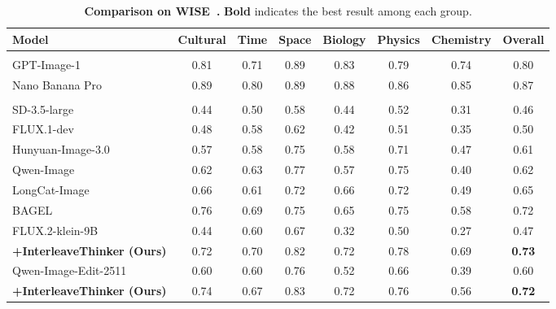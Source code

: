 \documentclass{article} %
\begin{document}
\begin{table}[t]
\small 
  \caption{\textbf{Comparison on WISE~\cite{niu2025wise}.} \textbf{Bold} indicates the best result among each group.}
  \label{tab:wise_benchmark_comparison}
  \centering
{
\setlength{\tabcolsep}{3pt}  
  \begin{tabular}{l ccccccc}
    \toprule[0.1em]
    \textbf{Model} & \textbf{Cultural} & \textbf{Time} & \textbf{Space} & \textbf{Biology} & \textbf{Physics} & \textbf{Chemistry} & \textbf{Overall} \\
    \midrule[0.1em]
    \rowcolor{gray!10}
    \multicolumn{8}{c}{\textbf{\textit{Proprietary Frontier Models}}} \\
    \midrule[0.1em]
    GPT-Image-1~\cite{gptimage}         & 0.81 & 0.71 & 0.89 & 0.83 & 0.79 & 0.74 & 0.80 \\
    Nano Banana Pro~\cite{nanopro}     & 0.89 & 0.80 & 0.89 & 0.88 & 0.86 & 0.85 & 0.87 \\
    \midrule[0.1em]
    \rowcolor{gray!10}
    \multicolumn{8}{c}{\textbf{\textit{Open-Sourced Models}}} \\
    \midrule[0.1em]
    SD-3.5-large~\cite{sd35l}        & 0.44 & 0.50 & 0.58 & 0.44 & 0.52 & 0.31 & 0.46 \\
    FLUX.1-dev~\cite{flux2024}          & 0.48 & 0.58 & 0.62 & 0.42 & 0.51 & 0.35 & 0.50 \\
    Hunyuan-Image-3.0~\cite{cao2025hunyuanimage} & 0.57 & 0.58 & 0.75 & 0.58 & 0.71 & 0.47 & 0.61 \\
    Qwen-Image~\cite{qwenimage}   & 0.62 & 0.63 & 0.77 & 0.57 & 0.75 & 0.40 & 0.62 \\
    LongCat-Image~\cite{longcatimage}  & 0.66 & 0.61 & 0.72 & 0.66 & 0.72 & 0.49 & 0.65 \\
    BAGEL~\cite{bagel}  & 0.76 & 0.69 & 0.75 & 0.65 & 0.75 & 0.58 & 0.72 \\
    \midrule[0.1em]
    FLUX.2-klein-9B~\cite{flux2}  & 0.44 & 0.60 & 0.67 & 0.32 & 0.50 & 0.27 & 0.47 \\
    \quad\textbf{+InterleaveThinker (Ours)} & 0.72 & 0.70 & 0.82 & 0.72 & 0.78 & 0.69 & \textbf{0.73}  \\
    Qwen-Image-Edit-2511~\cite{qwenimage} & 0.60 & 0.60 & 0.76 & 0.52 & 0.66 & 0.39 & 0.60 \\
    \quad\textbf{+InterleaveThinker (Ours)} & 0.74 & 0.67 & 0.83 & 0.72 & 0.76 & 0.56 & \textbf{0.72}  \\
    \bottomrule[0.1em]
  \end{tabular}
  }
  \vspace{-1em}
\end{table}
\end{document}
